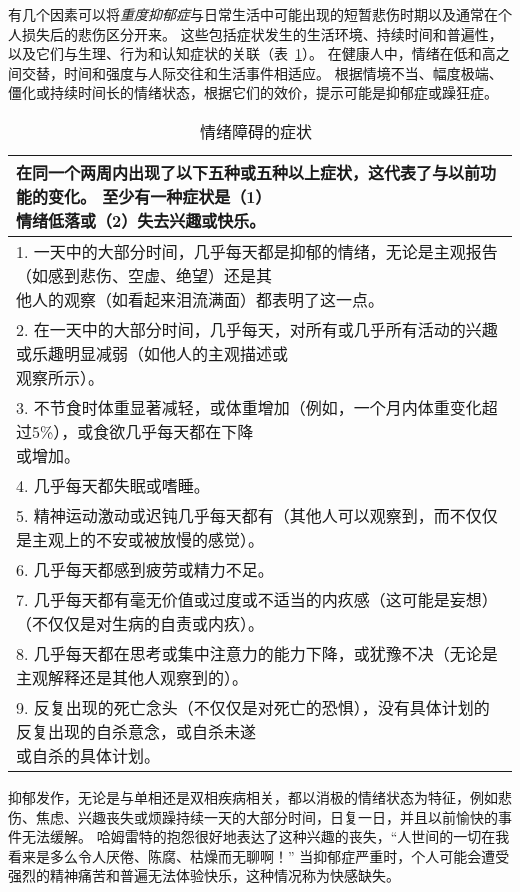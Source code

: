 有几个因素可以将\textit{重度抑郁症}与日常生活中可能出现的短暂悲伤时期以及通常在个人损失后的悲伤区分开来。
这些包括症状发生的生活环境、持续时间和普遍性，以及它们与生理、行为和认知症状的关联（表~\ref{tab:61_1}）。
在健康人中，情绪在低和高之间交替，时间和强度与人际交往和生活事件相适应。
根据情境不当、幅度极端、僵化或持续时间长的情绪状态，根据它们的效价，提示可能是抑郁症或躁狂症。


\begin{table}[htbp]
	\caption{情绪障碍的症状~\cite{vahia2013diagnostic} \label{tab:61_1}}
	\begin{tabular}{l}
		\toprule
		\makecell[l]{在同一个两周内出现了以下五种或五种以上症状，这代表了与以前功能的变化。
			至少有一种症状是（1） \\情绪低落或（2）失去兴趣或快乐。} \\
		\midrule
		\makecell[l]{1. 一天中的大部分时间，几乎每天都是抑郁的情绪，无论是主观报告（如感到悲伤、空虚、绝望）还是其\\他人的观察（如看起来泪流满面）都表明了这一点。}\\
		\makecell[l]{2. 在一天中的大部分时间，几乎每天，对所有或几乎所有活动的兴趣或乐趣明显减弱（如他人的主观描述或\\观察所示）。}\\
		\makecell[l]{3. 不节食时体重显著减轻，或体重增加（例如，一个月内体重变化超过5\%），或食欲几乎每天都在下降\\或增加。}\\
		4. 几乎每天都失眠或嗜睡。\\
		5. 精神运动激动或迟钝几乎每天都有（其他人可以观察到，而不仅仅是主观上的不安或被放慢的感觉）。  \\
		6. 几乎每天都感到疲劳或精力不足。\\
		7. 几乎每天都有毫无价值或过度或不适当的内疚感（这可能是妄想）（不仅仅是对生病的自责或内疚）。\\
		8. 几乎每天都在思考或集中注意力的能力下降，或犹豫不决（无论是主观解释还是其他人观察到的）。\\
		\makecell[l]{9. 反复出现的死亡念头（不仅仅是对死亡的恐惧），没有具体计划的反复出现的自杀意念，或自杀未遂\\或自杀的具体计划。} \\
		\bottomrule
	\end{tabular}
\end{table}


抑郁发作，无论是与单相还是双相疾病相关，都以消极的情绪状态为特征，例如悲伤、焦虑、兴趣丧失或烦躁持续一天的大部分时间，日复一日，并且以前愉快的事件无法缓解。
哈姆雷特的抱怨很好地表达了这种兴趣的丧失，“人世间的一切在我看来是多么令人厌倦、陈腐、枯燥而无聊啊！” 
当抑郁症严重时，个人可能会遭受强烈的精神痛苦和普遍无法体验快乐，这种情况称为快感缺失。


